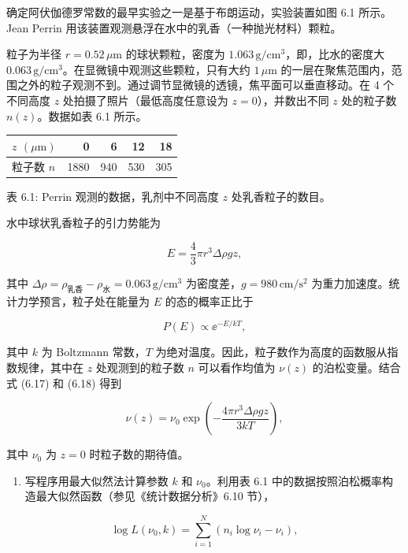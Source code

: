 \begin{question}
确定阿伏伽德罗常数的最早实验之一是基于布朗运动，实验装置如图 6.1
所示。Jean Perrin 用该装置观测悬浮在水中的乳香（一种抛光材料）颗粒。


粒子为半径 \(r=0.52\,\mu\mathrm{m}\) 的球状颗粒，密度为
\(1.063\,\mathrm{g/cm^3}\)，即，比水的密度大
\(0.063\,\mathrm{g/cm^3}\)。在显微镜中观测这些颗粒，只有大约
\(1\,\mu\mathrm{m}\)
的一层在聚焦范围内，范围之外的粒子观测不到。通过调节显微镜的透镜，焦平面可以垂直移动。在
4 个不同高度 \(z\) 处拍摄了照片（最低高度任意设为 \(z=0\)），并数出不同
\(z\) 处的粒子数 \(n(z)\)。数据如表 6.1 所示。

{%
\begin{longtable}[]{@{}lrrrr@{}}
\toprule\noalign{}
\(z\) \((\mu\mathrm{m})\) & 0 & 6 & 12 & 18 \\
\midrule\noalign{}
\endhead
\bottomrule\noalign{}
\endlastfoot
粒子数 \(n\) & 1880 & 940 & 530 & 305 \\
\end{longtable}
}

表 6.1: Perrin 观测的数据，乳剂中不同高度 \(z\) 处乳香粒子的数目。

水中球状乳香粒子的引力势能为

\[
E=\frac43\pi r^3\Delta\rho gz,
\]

其中 \(\Delta\rho=\rho_{\text{乳香}}-\rho_{\text{水}}=0.063\,\mathrm{g/cm^3}\)
为密度差，\(g=980\,\mathrm{cm/s^2}\)
为重力加速度。统计力学预言，粒子处在能量为 \(E\) 的态的概率正比于

\[
P(E)\propto \ee^{-E/kT},
\]

其中 \(k\) 为 Boltzmann 常数，\(T\)
为绝对温度。因此，粒子数作为高度的函数服从指数规律，其中在 \(z\)
处观测到的粒子数 \(n\) 可以看作均值为 \(\nu(z)\) 的泊松变量。结合式
(6.17) 和 (6.18) 得到

\[
\nu(z)=\nu_0\exp\left(-\frac{4\pi r^3\Delta\rho gz}{3kT}\right),
\]

其中 \(\nu_0\) 为 \(z=0\) 时粒子数的期待值。

\begin{enumerate}
\item
  写程序用最大似然法计算参数 \(k\) 和 \(\nu_0\)。利用表 6.1
  中的数据按照泊松概率构造最大似然函数（参见《统计数据分析》6.10 节），
\end{enumerate}

\[
\log L(\nu_0,k)=\sum_{i=1}^{N}(n_i\log\nu_i-\nu_i),
\]


\end{question}

